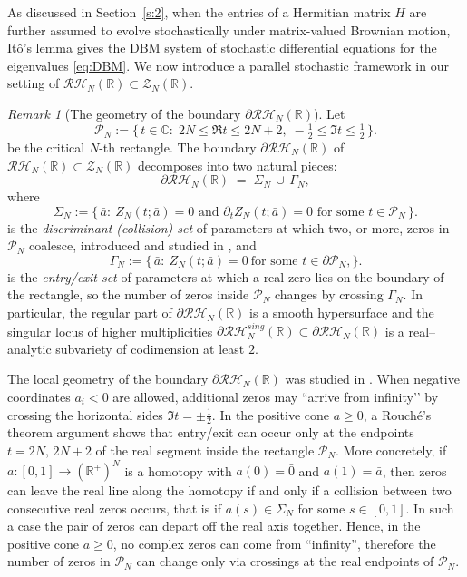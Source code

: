 \documentclass[12pt,reqno]{amsart}
\theoremstyle{plain}
\theoremstyle{definition}
\theoremstyle{remark}
\newtheorem{rem}{Remark}[section]       %
\begin{document}
As discussed in Section~\ref{s:2}, when the entries of a Hermitian matrix $H$ are further assumed to evolve stochastically under matrix-valued Brownian motion, Itô's lemma gives the DBM system of stochastic differential equations for the eigenvalues \eqref{eq:DBM}. We now introduce a parallel stochastic framework in our setting of $\mathcal{RH}_N (\mathbb{R}) \subset \mathcal{Z}_N (\mathbb{R})$. 

\begin{rem}[The geometry of the boundary \( \partial \mathcal{RH}_N (\mathbb{R}) \)]\label{rem:boundary}
Let 
\begin{equation}
\mathcal P_N:=\{\,t\in\mathbb C:\;2N\le \Re t\le 2N+2,\;-\tfrac12\le \Im t\le \tfrac12\,\}.
\end{equation} be the critical $N$-th rectangle. The boundary \(\partial\mathcal{RH}_N (\mathbb{R}) \) of \( \mathcal{RH}_N (\mathbb{R}) \subset \mathcal Z_N(\mathbb R)\) decomposes into two natural pieces:
\begin{equation}
\partial\mathcal{RH}_N(\mathbb{R}) \;=\; \Sigma_N \,\cup\, \Gamma_N,
\end{equation}
where
\begin{equation}
\Sigma_N := \bigl\{\,\bar a:\ Z_N(t;\bar a)=0 \text{ and } \partial_t Z_N(t;\bar a)=0 \text{ for some } t\in\mathcal P_N \,\bigr\}.
\end{equation}
is the \emph{discriminant (collision) set} of parameters at which two, or more, zeros in \(\mathcal P_N\) coalesce, introduced and studied in \cite{J3}, and
\begin{equation} 
\Gamma_N := \bigl\{\,\bar a:\ Z_N(t;\bar a)=0\ \text{for some } t\in\partial\mathcal P_N ,\bigr\}.
\end{equation}
is the \emph{entry/exit set} of parameters at which a real zero lies on the boundary of the rectangle, so the number of zeros inside \(\mathcal P_N  \) changes by crossing \(\Gamma_N\). In particular, the regular part of \( 
\partial\mathcal{RH}_N(\mathbb{R}) \) is a smooth hypersurface and the singular locus of higher multiplicities 
\(
\partial\mathcal{RH}^{sing}_N(\mathbb{R}) \subset 
\partial\mathcal{RH}_N(\mathbb{R}) \) is a real–analytic subvariety of codimension at least \(2\).

The local geometry of the boundary \(\partial\mathcal{RH}_N(\mathbb{R})\) was studied in \cite{J5,J3}. When negative coordinates \(a_i<0\) are allowed, additional zeros may “arrive from infinity’’ by crossing the horizontal sides \(\Im t=\pm \tfrac{1}{2}\). In the positive cone \(a\ge 0\), a Rouché’s theorem argument shows that entry/exit can occur only at the endpoints \(t=2N,\,2N+2\) of the real segment inside the rectangle $\mathcal{P}_N$. More concretely, if \(a:[0,1]\to(\mathbb{R}^+)^N\) is a homotopy with \(a(0)=\bar 0\) and \(a(1)=\bar a\), then zeros can leave the real line along the homotopy if and only if a collision between two consecutive real zeros occurs, that is if $a(s) \in \Sigma_N$ for some $s \in [0,1]$. In such a case the pair of zeros can depart off the real axis together. Hence, in the positive cone \(a\ge 0\), no complex zeros can come from “infinity”, therefore the number of zeros in \(\mathcal{P}_N\) can change only via crossings at the real endpoints of \(\mathcal{P}_N\).



\end{rem}
\end{document}
